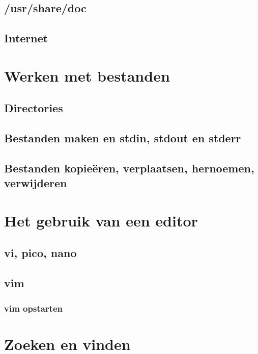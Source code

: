 \documentclass[a4paper,12pt,twoside,openright,titlepage]{book}
\begin{document}
\section{/usr/share/doc}

\section{Internet}


\chapter{Werken met bestanden}

\section{Directories}

\section{Bestanden maken en stdin, stdout en stderr}

\section{Bestanden kopie\"eren, verplaatsen, hernoemen, verwijderen}


\chapter{Het gebruik van een editor}

\section{vi, pico, nano}

\section{vim}

\subsection{vim opstarten}






\chapter{Zoeken en vinden}\label{zoekenenvinden}

\end{document}
